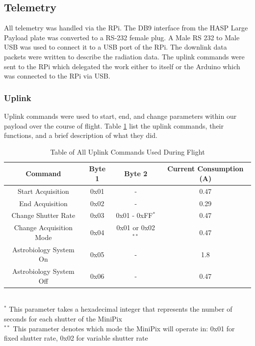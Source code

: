 \subsection{Telemetry}
\label{sec:Telemetry}

All telemetry was handled via the RPi. The DB9 interface from the HASP Large Payload plate was converted to a 
RS-232 female plug. A Male RS 232 to Male USB was used to connect it to a USB port of the RPi. 
The downlink data packets were written to describe the radiation data. 
The uplink commands were sent to the RPi which delegated the work either to itself or the Arduino which 
was connected to the RPi via USB.

\subsubsection{Uplink}
\label{sec:Uplink} 
Uplink commands were used to start, end, and change parameters within our payload over the course of flight. 
Table \ref{tab:All-Commands} list the uplink commands, their functions, and a brief description of what they did. 

\begin{table}[H]
\centering
\caption{Table of All Uplink Commands Used During Flight}
\label{tab:All-Commands}
\bigskip
\begin{tabular}{c|c|c|c}
\hline
\hline
\multicolumn{1}{c|}{\bfseries Command} & \multicolumn{1}{c|}{\bfseries Byte 1} &  \multicolumn{1}{c|}{\bfseries Byte 2} & \multicolumn{1}{c}{\bfseries Current Consumption (A)} \\
\hline
	Start Acquisition  		& 0x01	& -	 					& 0.47    \\ \hline
	End Acquisition 		& 0x02	& -	 					& 0.29    \\ \hline
	Change Shutter Rate 	& 0x03 	& 0x01 - 0xFF$^*$		& 0.47 		\\ \hline
	Change Acquisition Mode	& 0x04	& 0x01 or 0x02$^{**}$	& 0.47		\\ \hline
	Astrobiology System On	& 0x05	& -						& 1.8			\\ \hline
	Astrobiology System Off	& 0x06	& -						& 0.47		\\ \hline
\end{tabular}
\\
\footnotesize
$^{*}$ 	This parameter takes a hexadecimal integer that represents the number of seconds for each shutter of the MiniPix \\
$^{**}$	This parameter denotes which mode the MiniPix will operate in: 0x01 for fixed shutter rate, 0x02 for variable shutter rate
\medskip
\end{table}

